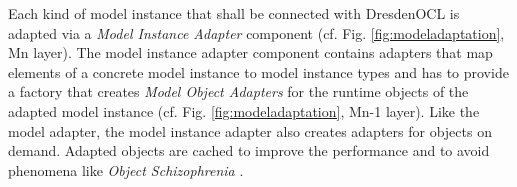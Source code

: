 	Each kind of model instance that shall be connected with DresdenOCL is
	adapted via a \emph{Model Instance Adapter} component (cf. Fig.
	\ref{fig:modeladaptation}, Mn layer). The model instance adapter component contains adapters that map elements of a
	concrete model instance to model instance types and has to
	provide a factory that creates \emph{Model Object Adapters} for the runtime 
	objects of the adapted model instance (cf. Fig. \ref{fig:modeladaptation}, Mn-1 layer). 
	Like the model adapter, the model instance adapter also 
	creates adapters for objects on demand. Adapted objects are cached to
	improve the performance and to avoid phenomena like \emph{Object
	Schizophrenia} \cite{assmann:isc}.
	



